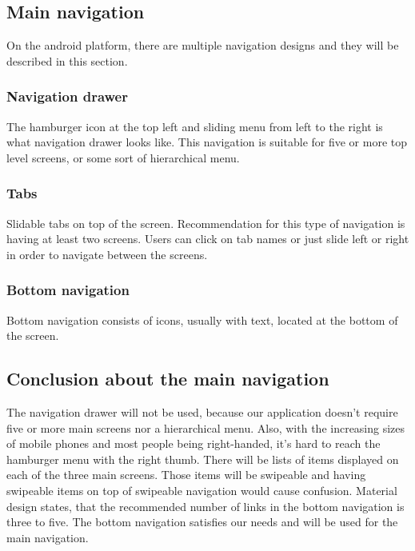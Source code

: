 \subsection{Main navigation}
On the android platform, there are multiple navigation designs and they will be described in this section.

\subsubsection{Navigation drawer}
The hamburger icon at the top left and sliding menu from left to the right is what navigation drawer looks like.
This navigation is suitable for five or more top level screens, or some sort of hierarchical menu.\cite{materialandroid}

\subsubsection{Tabs}
Slidable tabs on top of the screen.
Recommendation for this type of navigation is having at least two screens.\cite{materialandroid}
Users can click on tab names or just slide left or right in order to navigate between the screens.

\subsubsection{Bottom navigation}
Bottom navigation consists of icons, usually with text, located at the bottom of the screen.

\subsection{Conclusion about the main navigation}
The navigation drawer will not be used, because our application doesn't require five or more main screens nor a hierarchical menu.
Also, with the increasing sizes of mobile phones and most people being right-handed, it's hard to reach the hamburger menu with the right thumb.
There will be lists of items displayed on each of the three main screens.
Those items will be swipeable and having swipeable items on top of swipeable navigation would cause confusion.
Material design states, that the recommended number of links in the bottom navigation is three to five.\cite{materialandroid}
The bottom navigation satisfies our needs and will be used for the main navigation.


